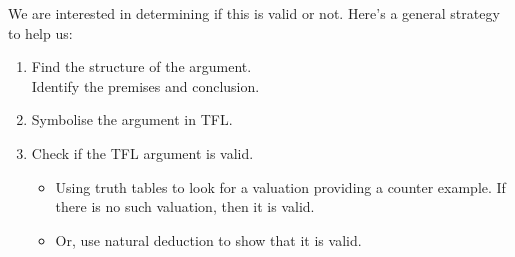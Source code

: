 We are interested in determining if this is valid or not. Here's a general strategy to help us:
\begin{highlighted}\begin{enumerate}
\item Find the structure of the argument. \\Identify the premises and conclusion.
\item \label{itm:validity-symbolise}Symbolise the argument in TFL.
\item \label{itm:validity-TTs} Check if the TFL argument is valid.\begin{itemize}\item Using truth tables to look for a valuation providing a counter example. If there is no such valuation, then it is valid.
\item Or, use natural deduction to show that it is valid.
\end{itemize}
\end{enumerate}
\end{highlighted}
\label{sec:checking validity}

